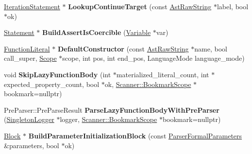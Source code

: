 \begin{DoxyCompactItemize}
\item 
\hyperlink{classv8_1_1internal_1_1_iteration_statement}{Iteration\+Statement} $\ast$ {\bfseries Lookup\+Continue\+Target} (const \hyperlink{classv8_1_1internal_1_1_ast_raw_string}{Ast\+Raw\+String} $\ast$label, bool $\ast$ok)\hypertarget{classv8_1_1internal_1_1_parser_a04dd3052035b8dd53c75d5071a53b076}{}\label{classv8_1_1internal_1_1_parser_a04dd3052035b8dd53c75d5071a53b076}

\item 
\hyperlink{classv8_1_1internal_1_1_statement}{Statement} $\ast$ {\bfseries Build\+Assert\+Is\+Coercible} (\hyperlink{classv8_1_1internal_1_1_variable}{Variable} $\ast$var)\hypertarget{classv8_1_1internal_1_1_parser_a0069b9bbf152047ae57f6d2cfc33714a}{}\label{classv8_1_1internal_1_1_parser_a0069b9bbf152047ae57f6d2cfc33714a}

\item 
\hyperlink{classv8_1_1internal_1_1_function_literal}{Function\+Literal} $\ast$ {\bfseries Default\+Constructor} (const \hyperlink{classv8_1_1internal_1_1_ast_raw_string}{Ast\+Raw\+String} $\ast$name, bool call\+\_\+super, \hyperlink{classv8_1_1internal_1_1_scope}{Scope} $\ast$scope, int pos, int end\+\_\+pos, Language\+Mode language\+\_\+mode)\hypertarget{classv8_1_1internal_1_1_parser_adf3f42e2aed70ac830eb5764be0be111}{}\label{classv8_1_1internal_1_1_parser_adf3f42e2aed70ac830eb5764be0be111}

\item 
void {\bfseries Skip\+Lazy\+Function\+Body} (int $\ast$materialized\+\_\+literal\+\_\+count, int $\ast$expected\+\_\+property\+\_\+count, bool $\ast$ok, \hyperlink{classv8_1_1internal_1_1_scanner_1_1_bookmark_scope}{Scanner\+::\+Bookmark\+Scope} $\ast$bookmark=nullptr)\hypertarget{classv8_1_1internal_1_1_parser_a10c218d0c27102b1930d667effcdca6a}{}\label{classv8_1_1internal_1_1_parser_a10c218d0c27102b1930d667effcdca6a}

\item 
Pre\+Parser\+::\+Pre\+Parse\+Result {\bfseries Parse\+Lazy\+Function\+Body\+With\+Pre\+Parser} (\hyperlink{classv8_1_1internal_1_1_singleton_logger}{Singleton\+Logger} $\ast$logger, \hyperlink{classv8_1_1internal_1_1_scanner_1_1_bookmark_scope}{Scanner\+::\+Bookmark\+Scope} $\ast$bookmark=nullptr)\hypertarget{classv8_1_1internal_1_1_parser_a4d0c03eb89e97731b59389a1b7aa3ef8}{}\label{classv8_1_1internal_1_1_parser_a4d0c03eb89e97731b59389a1b7aa3ef8}

\item 
\hyperlink{classv8_1_1internal_1_1_block}{Block} $\ast$ {\bfseries Build\+Parameter\+Initialization\+Block} (const \hyperlink{structv8_1_1internal_1_1_parser_formal_parameters}{Parser\+Formal\+Parameters} \&parameters, bool $\ast$ok)\hypertarget{classv8_1_1internal_1_1_parser_ab28543223006dc3c2ec209da571e78e7}{}\label{classv8_1_1internal_1_1_parser_ab28543223006dc3c2ec209da571e78e7}


\end{DoxyCompactItemize}
